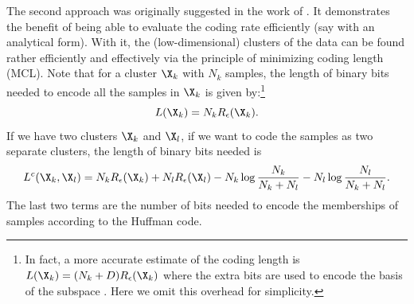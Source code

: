 \documentclass[../../book-main.tex]{subfiles}
\begin{document}
The second approach was originally suggested in the work of \cite{ma2007segmentation}. It demonstrates the benefit of being able to evaluate the coding rate efficiently (say with an analytical form). With it, the (low-dimensional) clusters of the data can be found rather efficiently and effectively via the principle of minimizing coding length (MCL). Note that for a cluster $\X_k$ with $N_k$ samples, the length of binary bits needed to encode all the samples in $\X_k$ is given by:\footnote{In fact, a more accurate estimate of the coding length is $L(\X_k) = (N_k+D) R_\epsilon(\X_k)$ where the extra bits are used to encode the basis of the subspace \cite{ma2007segmentation}. Here we omit this overhead for simplicity.}
\begin{equation}
	L(\X_k) = N_k R_\epsilon(\X_k).
\end{equation}
If we have two clusters $\X_k$ and $\X_l$, if we want to code the samples as two separate clusters, the length of binary bits needed is
\begin{equation*}
	L^c(\X_k, \X_l) = N_k R_\epsilon(\X_k) + N_l R_\epsilon(\X_l) - N_k \log\frac{N_k}{N_k + N_l} - N_l \log\frac{N_l}{N_k + N_l}.
\end{equation*}
The last two terms are the number of bits needed to encode the memberships of samples according to the Huffman code.
\end{document}
